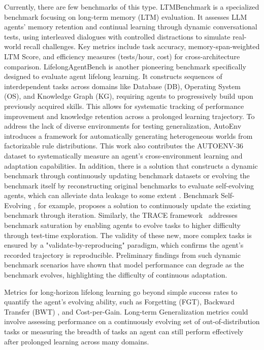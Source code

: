 Currently, there are few benchmarks of this type. 
LTMBenchmark \citep{castillo-bolado2024beyond} is a specialized benchmark focusing on long-term memory (LTM) evaluation. It assesses LLM agents' memory retention and continual learning through dynamic conversational tests, using interleaved dialogues with controlled distractions to simulate real-world recall challenges. Key metrics include task accuracy, memory-span-weighted LTM Score, and efficiency measures (tests/hour, cost) for cross-architecture comparison.
LifelongAgentBench \citep{zheng2025lifelongagentbench} is another pioneering benchmark specifically designed to evaluate agent lifelong learning. It constructs sequences of interdependent tasks across domains like Database (DB), Operating System (OS), and Knowledge Graph (KG), requiring agents to progressively build upon previously acquired skills. This allows for systematic tracking of performance improvement and knowledge retention across a prolonged learning trajectory. To address the lack of diverse environments for testing generalization, AutoEnv~\citep{zhang2025autoenv} introduces a framework for automatically generating heterogeneous worlds from factorizable rule distributions. This work also contributes the AUTOENV-36 dataset to systematically measure an agent's cross-environment learning and adaptation capabilities.
In addition, there is a solution that constructs a dynamic benchmark through continuously updating benchmark datasets \citep{white2024livebench, yang2025truly} or evolving the benchmark itself by reconstructing original benchmarks to evaluate self-evolving agents, which can alleviate data leakage to some extent \citep{chen2025recent}. Benchmark Self-Evolving \citep{wang2024benchmark}, for example, proposes a solution to continuously update the existing benchmark through iteration. Similarly, the TRACE framework~\citep{guo2025selfevolvingbenchmark} addresses benchmark saturation by enabling agents to evolve tasks to higher difficulty through test-time exploration. The validity of these new, more complex tasks is ensured by a "validate-by-reproducing" paradigm, which confirms the agent's recorded trajectory is reproducible.
Preliminary findings from such dynamic benchmark scenarios have shown that model performance can degrade as the benchmark evolves, highlighting the difficulty of continuous adaptation.

Metrics for long-horizon lifelong learning go beyond simple success rates to quantify the agent's evolving ability, such as Forgetting (FGT), Backward Transfer (BWT) \citep{zheng2025lifelong}, and Cost-per-Gain. Long-term Generalization metrics could involve assessing performance on a continuously evolving set of out-of-distribution tasks or measuring the breadth of tasks an agent can still perform effectively after prolonged learning across many domains.

